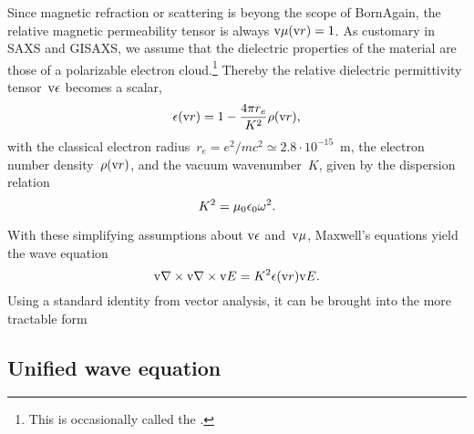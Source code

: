 Since magnetic refraction or scattering is beyong the scope of BornAgain,
the relative magnetic permeability tensor is always $\text{v}{\mu}(\text{v}{r})=1$.
%
%
As customary in SAXS and GISAXS,
%
%
we assume
that the dielectric properties of the material are those of a polarizable electron cloud.\footnote
{This is occasionally called the 
%
 \cite{Lau31}.}
Thereby the relative dielectric permittivity tensor~$\text{v}{\epsilon}$
%
%
becomes a scalar,
\begin{equation}
  \epsilon(\text{v}{r})=1-\frac{4\pi r_e}{K^2}\rho(\text{v}{r}),
\end{equation}
%
%
with the classical electron radius~$r_e=e^2/mc^2\simeq2.8\cdot10^{-15}$~m,
%
%
%
the electron number density~$\rho(\text{v}{r})$,
%
%
%
and the vacuum wavenumber~$K$,
given by the dispersion relation
\begin{equation}
  K^2 = \mu_0\epsilon_0\omega^2.
\end{equation}
%

With these simplifying assumptions about $\text{v}{\epsilon}$ and~$\text{v}{\mu}$,
Maxwell's equations yield the wave equation
\begin{equation}\label{ENabCrossNabE}
  \text{v}{\nabla}\times\text{v}{\nabla}\times\text{v}{E} = K^2\epsilon(\text{v}{r})\text{v}{E}.
\end{equation}
%
%
Using a standard identity from vector analysis, it can be brought into the more tractable form

%

\subsection{Unified wave equation}\label{SUniWave}


